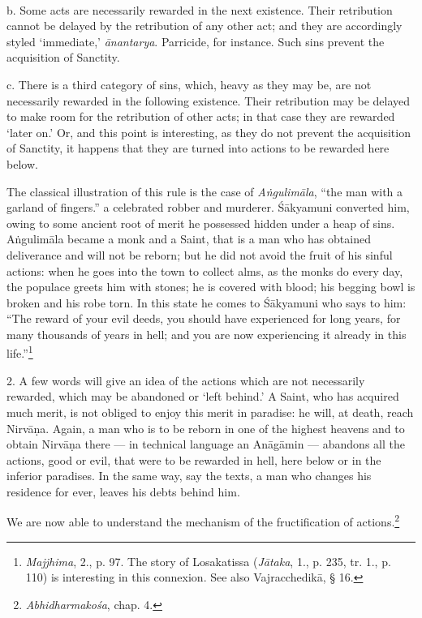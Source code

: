 \documentclass[a4paper, 11pt, oneside, english]{article}
\begin{document}
\paragraph{}
b. Some acts are necessarily rewarded in the next existence. Their retribution cannot be delayed by the retribution of any other act; and they are accordingly styled `immediate,' \emph{ānantarya}. Parricide, for instance. Such sins prevent the acquisition of Sanctity.

c. There is a third category of sins, which, heavy as they may be, are not necessarily rewarded in the following existence. Their retribution may be delayed to make room for the retribution of other acts; in that case they are rewarded `later on.' Or, and this point is interesting, as they do not prevent the acquisition of Sanctity, it happens that they are turned into actions to be rewarded here below.

The classical illustration of this rule is the case of \emph{Aṅgulimāla}, ``the man with a garland of fingers.'' a celebrated robber and murderer. Śākyamuni converted him, owing to some ancient root of merit he possessed hidden under a heap of sins. Aṅgulimāla became a monk and a Saint, that is a man who has obtained deliverance and will not be reborn; but he did not avoid the fruit of his sinful actions: when he goes into the town to collect alms, as the monks do every day, the populace greets him with stones; he is covered with blood; his begging bowl is broken and his robe torn. In this state he comes to Śākyamuni who says to him: ``The reward of your evil deeds, you should have experienced for long years, for many thousands of years in hell; and you are now experiencing it already in this life.''\footnote{\emph{Majjhima}, 2., p. 97. The story of Losakatissa (\emph{Jātaka}, 1., p. 235, tr. 1., p. 110) is interesting in this connexion. See also Vajracchedikā, § 16.}

2. A few words will give an idea of the actions which are not necessarily rewarded, which may be abandoned or `left behind.' A Saint, who has acquired much merit, is not obliged to enjoy this merit in paradise: he will, at death, reach Nirvāṇa. Again, a man who is to be reborn in one of the highest heavens and to obtain Nirvāṇa there --- in technical language an Anāgāmin --- abandons all the actions, good or evil, that were to be rewarded in hell, here below or in the inferior paradises. In the same way, say the texts, a man who changes his residence for ever, leaves his debts behind him.

We are now able to understand the mechanism of the fructification of actions.\footnote{\emph{Abhidharmakośa}, chap. 4.}
\end{document}
